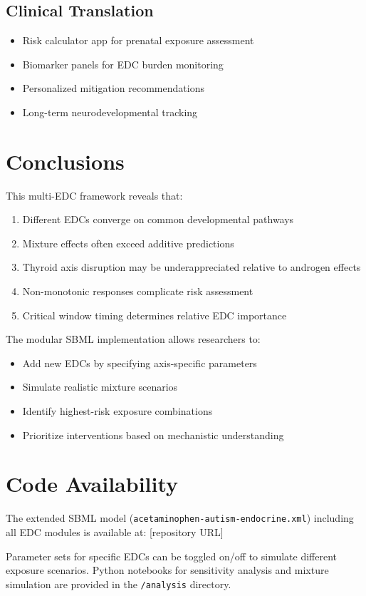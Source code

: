 \documentclass[11pt]{article}
\begin{document}
\subsection{Clinical Translation}
\begin{itemize}
\item Risk calculator app for prenatal exposure assessment
\item Biomarker panels for EDC burden monitoring
\item Personalized mitigation recommendations
\item Long-term neurodevelopmental tracking
\end{itemize}

\section{Conclusions}

This multi-EDC framework reveals that:
\begin{enumerate}
\item Different EDCs converge on common developmental pathways
\item Mixture effects often exceed additive predictions
\item Thyroid axis disruption may be underappreciated relative to androgen effects
\item Non-monotonic responses complicate risk assessment
\item Critical window timing determines relative EDC importance
\end{enumerate}

The modular SBML implementation allows researchers to:
\begin{itemize}
\item Add new EDCs by specifying axis-specific parameters
\item Simulate realistic mixture scenarios
\item Identify highest-risk exposure combinations
\item Prioritize interventions based on mechanistic understanding
\end{itemize}

\section{Code Availability}

The extended SBML model (\texttt{acetaminophen-autism-endocrine.xml}) including all EDC modules is available at: [repository URL]

Parameter sets for specific EDCs can be toggled on/off to simulate different exposure scenarios. Python notebooks for sensitivity analysis and mixture simulation are provided in the \texttt{/analysis} directory.
\end{document}
